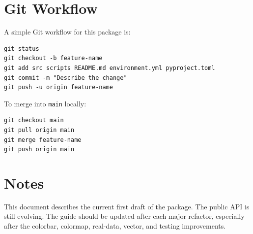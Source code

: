 \documentclass[11pt,a4paper]{article}
\begin{document}
\section{Git Workflow}

A simple Git workflow for this package is:

\begin{lstlisting}[style=bashstyle]
git status
git checkout -b feature-name
git add src scripts README.md environment.yml pyproject.toml
git commit -m "Describe the change"
git push -u origin feature-name
\end{lstlisting}

To merge into \texttt{main} locally:

\begin{lstlisting}[style=bashstyle]
git checkout main
git pull origin main
git merge feature-name
git push origin main
\end{lstlisting}

\section{Notes}

This document describes the current first draft of the package. The public API is still evolving.
The guide should be updated after each major refactor, especially after the colorbar, colormap,
real-data, vector, and testing improvements.
\end{document}
